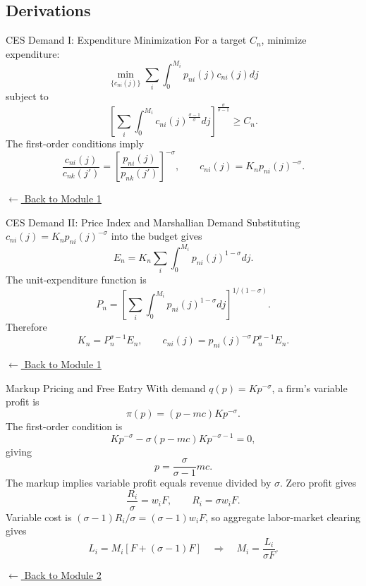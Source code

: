 \documentclass[aspectratio=169,11pt]{beamer}
\newcommand{\backlink}[2]{%
  \hyperlink{#1}{\textcolor{blue1}{\footnotesize
  \(\longleftarrow\) #2}}}
\begin{document}
\subsection{Derivations}

\begin{frame}[label=appCES]{CES Demand I: Expenditure Minimization}
  For a target \(C_n\), minimize expenditure:
  \[
    \min_{\{c_{ni}(j)\}}
    \sum_i\int_0^{M_i}p_{ni}(j)c_{ni}(j)dj
  \]
  subject to
  \[
    \left[
      \sum_i\int_0^{M_i}
      c_{ni}(j)^{\frac{\sigma-1}{\sigma}}dj
    \right]^{\frac{\sigma}{\sigma-1}}
    \geq C_n.
  \]
  The first-order conditions imply
  \[
    \frac{c_{ni}(j)}{c_{nk}(j')}
    =
    \left[
      \frac{p_{ni}(j)}{p_{nk}(j')}
    \right]^{-\sigma},
    \qquad
    c_{ni}(j)=K_np_{ni}(j)^{-\sigma}.
  \]

  \smallskip
  \hfill\backlink{mainPreferences}{Back to Module 1}
\end{frame}

\begin{frame}{CES Demand II: Price Index and Marshallian Demand}
  Substituting \(c_{ni}(j)=K_np_{ni}(j)^{-\sigma}\) into the budget gives
  \[
    E_n
    =
    K_n\sum_i\int_0^{M_i}p_{ni}(j)^{1-\sigma}dj.
  \]
  The unit-expenditure function is
  \[
    P_n
    =
    \left[
      \sum_i\int_0^{M_i}p_{ni}(j)^{1-\sigma}dj
    \right]^{1/(1-\sigma)}.
  \]
  Therefore
  \[
    K_n=P_n^{\sigma-1}E_n,
    \qquad
      c_{ni}(j)
      =
      p_{ni}(j)^{-\sigma}P_n^{\sigma-1}E_n.
  \]

  \smallskip
  \hfill\backlink{mainPreferences}{Back to Module 1}
\end{frame}

\begin{frame}[label=appProduction]{Markup Pricing and Free Entry}
  \small
  With demand \(q(p)=Kp^{-\sigma}\), a firm's variable profit is
  \[
    \pi(p)=(p-mc)Kp^{-\sigma}.
  \]
  The first-order condition is
  \[
    Kp^{-\sigma}
    -\sigma(p-mc)Kp^{-\sigma-1}=0,
  \]
  giving
  \[
    p=\frac{\sigma}{\sigma-1}mc.
  \]
  The markup implies variable profit equals revenue divided by \(\sigma\).
  Zero profit gives
  \[
    \frac{R_i}{\sigma}=w_iF,
    \qquad
    R_i=\sigma w_iF.
  \]
  Variable cost is \((\sigma-1)R_i/\sigma=(\sigma-1)w_iF\), so aggregate
  labor-market clearing gives
  \[
    L_i=M_i\left[F+(\sigma-1)F\right]
    \quad\Longrightarrow\quad
    M_i=\frac{L_i}{\sigma F}.
  \]

  \smallskip
  \hfill\backlink{mainProduction}{Back to Module 2}
\end{frame}
\end{document}
